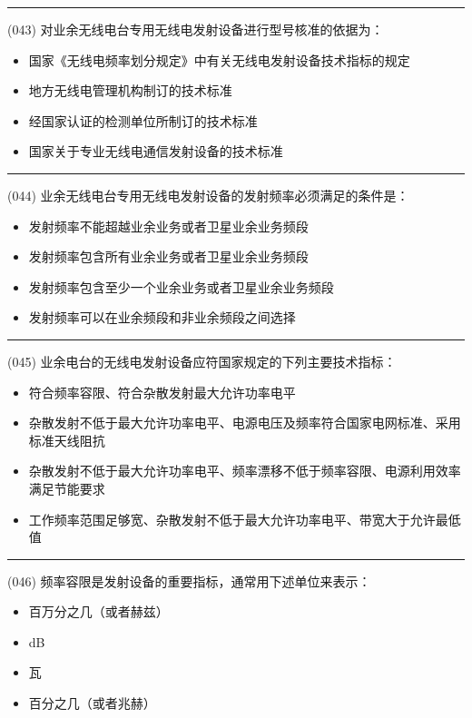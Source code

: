 \documentclass[twocolumn]{ctexart}  %
\begin{document}
\noindent\rule{0.5\textwidth}{1pt}
\heiti (043) 对业余无线电台专用无线电发射设备进行型号核准的依据为： \songti {\color{gray} [LK0039] }
\begin{itemize}
	\item  国家《无线电频率划分规定》中有关无线电发射设备技术指标的规定
	\item  地方无线电管理机构制订的技术标准
	\item  经国家认证的检测单位所制订的技术标准
	\item  国家关于专业无线电通信发射设备的技术标准
\end{itemize}


\noindent\rule{0.5\textwidth}{1pt}
\heiti (044) 业余无线电台专用无线电发射设备的发射频率必须满足的条件是： \songti {\color{gray} [LK0040] }
\begin{itemize}
	\item  发射频率不能超越业余业务或者卫星业余业务频段
	\item  发射频率包含所有业余业务或者卫星业余业务频段
	\item  发射频率包含至少一个业余业务或者卫星业余业务频段
	\item  发射频率可以在业余频段和非业余频段之间选择
\end{itemize}


\noindent\rule{0.5\textwidth}{1pt}
\heiti (045) 业余电台的无线电发射设备应符国家规定的下列主要技术指标： \songti {\color{gray} [LK0116] }
\begin{itemize}
	\item  符合频率容限、符合杂散发射最大允许功率电平
	\item  杂散发射不低于最大允许功率电平、电源电压及频率符合国家电网标准、采用标准天线阻抗
	\item  杂散发射不低于最大允许功率电平、频率漂移不低于频率容限、电源利用效率满足节能要求
	\item  工作频率范围足够宽、杂散发射不低于最大允许功率电平、带宽大于允许最低值
\end{itemize}


\noindent\rule{0.5\textwidth}{1pt}
\heiti (046) 频率容限是发射设备的重要指标，通常用下述单位来表示： \songti {\color{gray} [LK0117] }
\begin{itemize}
	\item  百万分之几（或者赫兹）
	\item  dB
	\item  瓦
	\item  百分之几（或者兆赫）
\end{itemize}
\end{document}
